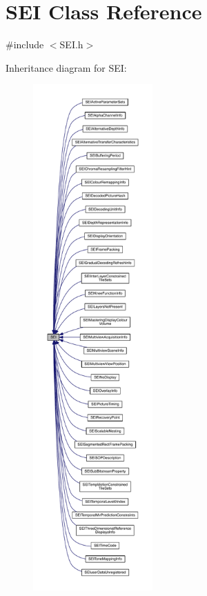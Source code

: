 \hypertarget{class_s_e_i}{}\section{S\+EI Class Reference}
\label{class_s_e_i}


{\ttfamily \#include $<$S\+E\+I.\+h$>$}



Inheritance diagram for S\+EI\+:
\nopagebreak
\begin{figure}[H]
\begin{center}
\leavevmode
\includegraphics[height=550pt]{d0/daa/class_s_e_i__inherit__graph}
\end{center}
\end{figure}



